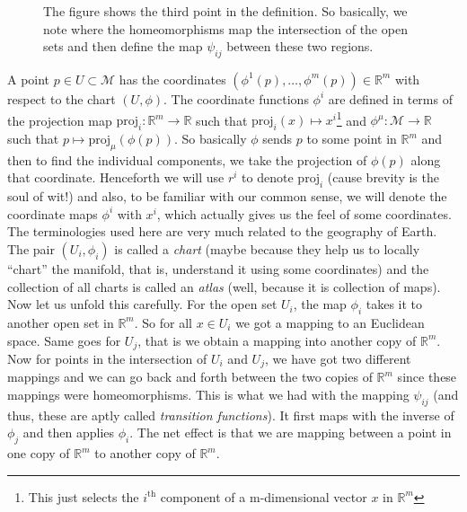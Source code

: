 \begin{figure}[H]
  \centering 
  
  \caption{The figure shows the third point in the definition. So basically, we note where the homeomorphisms map the intersection of the open sets and then define the map $\psi_{ij}$ between these two regions.}
\end{figure}
A point $p \in U \subset \mathcal{M}$ has the coordinates $(\phi^1(p),\ldots, \phi^m(p) )\in \mathbb{R}^m$ with respect to the chart $(U,\phi)$. The coordinate functions $\phi^i$ are defined in terms of the projection map $\mathrm{proj}_i:\mathbb{R}^m \longrightarrow \mathbb{R}$ such that $\mathrm{proj}_i(x) \mapsto x^i$\footnote{This just selects the $i^{\text{th}}$ component of a m-dimensional vector $x$ in $\mathbb{R}^m$} and $\phi^\mu: \mathcal{M}\rightarrow \mathbb{R}$ such that $p \mapsto \mathrm{proj}_\mu(\phi(p))$. So basically $\phi$ sends $p$ to some point in $\mathbb{R}^m$ and then to find the individual components, we take the projection of $\phi(p)$ along that coordinate. Henceforth we will use $r^i$ to denote $\mathrm{proj}_i$ (cause brevity is the soul of wit!) and also, to be familiar with our common sense, we will denote the coordinate maps $\phi^i$ with $x^i$, which actually gives us the feel of some coordinates.\\[0.3cm]
The terminologies used here are very much related to the geography of Earth. The pair $(U_i, \phi_i)$ is called a \textit{chart} (maybe because they help us to locally ``chart'' the manifold, that is, understand it using some coordinates) and the collection of all charts is called an \textit{atlas} (well, because it is collection of maps). \\[0.3cm]
Now let us unfold this carefully. For the open set $U_i$, the map $\phi_i$ takes it to another open set in $\mathbb{R}^m$. So for all $x\in U_i$ we got a mapping to an Euclidean space. Same goes for $U_j$, that is we obtain a mapping into another copy of $\mathbb{R}^m$. Now for points in the intersection of $U_i$ and $U_j$, we have got two different mappings and we can go back and forth between the two copies of $\mathbb{R}^m$ since these mappings were homeomorphisms. This is what we had with the mapping $\psi_{ij}$ (and thus, these are aptly called \textit{transition functions}). It first maps with the inverse of $\phi_j$  and then applies $\phi_i$. The net effect is that we are mapping between a point in one copy of $\mathbb{R}^m$ to another copy of $\mathbb{R}^m$. \\[0.3cm]
